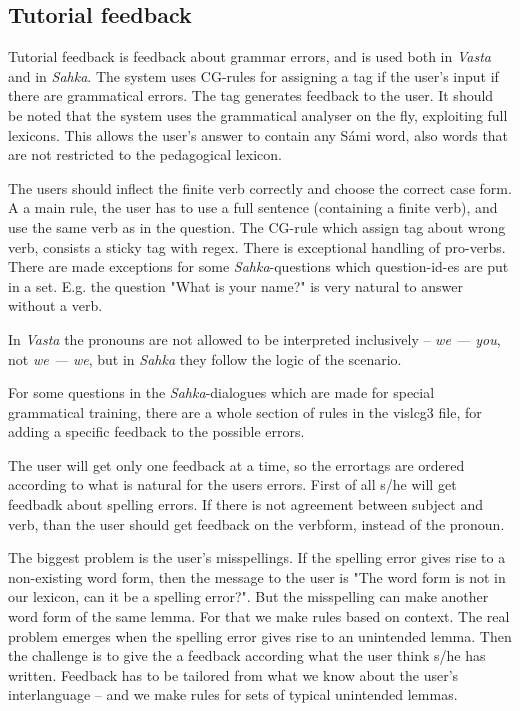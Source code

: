 \documentclass[11pt]{article}
\begin{document}
\subsection{Tutorial feedback}
Tutorial feedback is feedback about grammar errors, and is used both in \textit{Vasta} and in \textit{Sahka}. The system uses CG-rules for assigning a tag if the user's input if there are grammatical errors. The tag generates feedback to the user. It should be noted that the system uses the grammatical analyser on the fly, exploiting full lexicons. This allows the user's answer to contain any Sámi word, also words that are not restricted to the pedagogical lexicon.

The users should inflect the finite verb correctly and choose the correct case form. A a main rule, the user has to use a full sentence (containing a finite verb), and use the same verb as in the question. The CG-rule which assign tag about wrong verb, consists a sticky tag with regex. There is exceptional handling of pro-verbs. There are made exceptions for some \textit{Sahka}-questions which question-id-es are put in a set. E.g. the question "What is your name?" is very natural to answer without a verb. 

In \textit{Vasta} the pronouns are not allowed to be interpreted inclusively -- \textit{we — you}, not \textit{we — we}, but in \textit{Sahka} they follow the logic of the scenario.

For some questions in the \textit{Sahka}-dialogues which are made for special grammatical training, there are a whole section of rules in the vislcg3 file, for adding a specific feedback to the possible errors.

The user will get only one feedback at a time, so the errortags are ordered according to what is natural for the users errors. First of all s/he will get feedbadk about spelling errors. If there is not agreement between subject and verb, than the user should get feedback on the verbform, instead of the pronoun.

The biggest problem is the user's misspellings. If the spelling error gives rise to a non-existing word form, then the message to the user is "The word form is not in our lexicon, can it be a spelling error?". But the misspelling can make another word form of the same lemma. For that we make rules based on context. The real problem emerges when the spelling error gives rise to an unintended lemma. Then the challenge is to give the a feedback according what the user think s/he has written. Feedback has to be tailored from what we know about the user’s interlanguage – and we make rules for sets of typical unintended lemmas.
\end{document}
